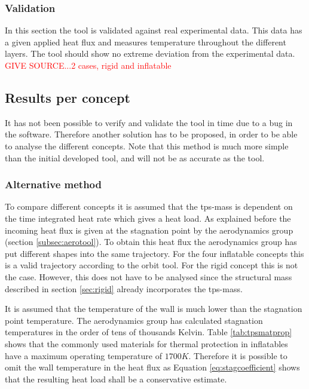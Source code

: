 \subsubsection{Validation}
In this section the tool is validated against real experimental data. This data has a given applied heat flux and measures temperature throughout the different layers. The tool should show no extreme deviation from the experimental data. \textcolor{red}{GIVE SOURCE...2 cases, rigid and inflatable}


\subsection{Results per concept}
It has not been possible to verify and validate the tool in time due to a bug in the software. Therefore another solution has to be proposed, in order to be able to analyse the different concepts. Note that this method is much more simple than the initial developed tool, and will not be as accurate as the tool. 

\subsubsection{Alternative method}
To compare different concepts it is assumed that the \gls{tps}-mass is dependent on the time integrated heat rate which gives a heat load. As explained before the incoming heat flux is given at the stagnation point by the aerodynamics group (section \ref{subsec:aerotool}). To obtain this heat flux the aerodynamics group has put different shapes into the same trajectory. For the four inflatable concepts this is a valid trajectory according to the orbit tool. For the rigid concept this is not the case. However, this does not have to be analysed since the structural mass described in section \ref{sec:rigid} already incorporates the \gls{tps}-mass.

It is assumed that the temperature of the wall is much lower than the stagnation point temperature. The aerodynamics group has calculated stagnation temperatures in the order of tens of thousands Kelvin. Table \ref{tab:tpsmatprop} shows that the commonly used materials for thermal protection in inflatables have a maximum operating temperature of $1700K$. Therefore it is possible to omit the wall temperature in the heat flux as Equation \eqref{eq:stagcoefficient} shows that the resulting heat load shall be a conservative estimate. 


